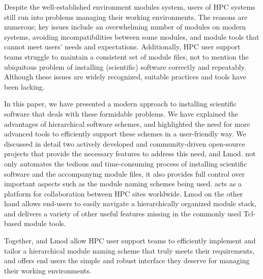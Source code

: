 Despite the well-established environment modules system, users of HPC systems still
run into problems managing their working environments. The reasons are numerous; key
issues include an overwhelming number of modules on modern systems, avoiding
incompatibilities between some modules, and module tools that cannot meet users' needs 
and expectations. Additionally, HPC user support teams struggle to maintain a
consistent set of module files, not to mention the ubiquitous problem of
installing (scientific) software correctly and repeatably. Although these issues are
widely recognized, suitable practices and tools have been lacking.

In this paper, we have presented a modern approach to installing scientific software
that deals with these formidable problems. We have explained the advantages of
hierarchical software schemes, and highlighted the need for more advanced tools to
efficiently support these schemes in a user-friendly way. We discussed in detail two
actively developed and community-driven open-source projects that provide the
necessary features to address this need, \easybuild{} and Lmod. \easybuild{} not only
automates the tedious and time-consuming process of installing scientific software
and the accompanying module files, it also provides full control over important
aspects such as the module naming schemes being used. \easybuild{} acts as a platform
for collaboration between HPC sites worldwide. Lmod on the other hand allows end-users
to easily navigate a hierarchically organized module stack, and delivers a variety of
other useful features missing in the commonly used Tcl-based module tools.

Together, \easybuild{} and Lmod allow HPC user support teams to efficiently implement
and tailor a hierarchical module naming scheme that truly meets their requirements,
and offers end users the simple and robust interface they deserve for managing their
working environments.
